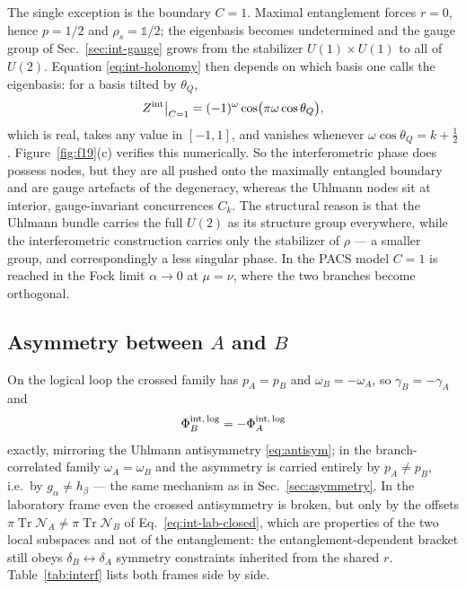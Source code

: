 \documentclass[11pt]{article}
\newcommand{\Tr}{\operatorname{Tr}}
\begin{document}
The single exception is the boundary $C=1$. Maximal entanglement forces $r=0$,
hence $p=1/2$ and $\rho_s=\mathbb 1/2$; the eigenbasis becomes undetermined and
the gauge group of Sec.~\ref{sec:int-gauge} grows from the stabilizer
$U(1)\times U(1)$ to all of $U(2)$. Equation \eqref{eq:int-holonomy} then
depends on which basis one calls the eigenbasis: for a basis tilted by
$\theta_Q$,
\begin{equation}
Z^{\rm int}\big|_{C=1}=(-1)^{\omega}\cos\!\big(\pi\omega\cos\theta_Q\big),
\label{eq:degenerate}
\end{equation}
which is real, takes any value in $[-1,1]$, and vanishes whenever
$\omega\cos\theta_Q=k+\tfrac12$. Figure~\ref{fig:f19}(c) verifies this
numerically. So the interferometric phase does possess nodes, but they are all
pushed onto the maximally entangled boundary and are gauge artefacts of the
degeneracy, whereas the Uhlmann nodes sit at interior, gauge-invariant
concurrences $C_k$. The structural reason is that the Uhlmann bundle carries
the full $U(2)$ as its structure group everywhere, while the interferometric
construction carries only the stabilizer of $\rho$ --- a smaller group, and
correspondingly a less singular phase. In the PACS model $C=1$ is reached in
the Fock limit $\alpha\to0$ at $\mu=\nu$, where the two branches become
orthogonal.

\subsection{Asymmetry between $A$ and $B$}

On the logical loop the crossed family has $p_A=p_B$ and
$\omega_B=-\omega_A$, so $\gamma_B=-\gamma_A$ and
\begin{equation}
\Phi^{\rm int,\,log}_B=-\Phi^{\rm int,\,log}_A
\label{eq:int-antisym}
\end{equation}
exactly, mirroring the Uhlmann antisymmetry \eqref{eq:antisym}; in the
branch-correlated family $\omega_A=\omega_B$ and the asymmetry is carried
entirely by $p_A\neq p_B$, i.e.\ by $g_\alpha\neq h_\beta$ --- the same
mechanism as in Sec.~\ref{sec:asymmetry}. In the laboratory frame even the
crossed antisymmetry is broken, but only by the offsets
$\pi\Tr\mathcal N_A\neq\pi\Tr\mathcal N_B$ of
Eq.~\eqref{eq:int-lab-closed}, which are properties of the two local
subspaces and not of the entanglement: the entanglement-dependent bracket
still obeys $\delta_B\leftrightarrow\delta_A$ symmetry constraints inherited
from the shared $r$. Table~\ref{tab:interf} lists both frames side by side.
\end{document}
